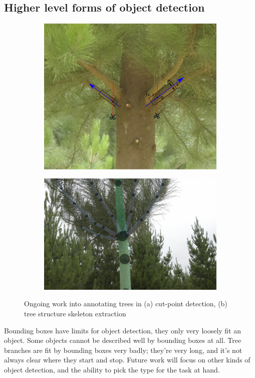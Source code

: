 \subsection{Higher level forms of object detection}

\begin{figure}[h!]
\begin{subfigure}[t]{1.0\linewidth}
  \centering
  \includegraphics[width=0.8\linewidth]{figures/future/tree_cutpoint.pdf}
  \caption{} 
\end{subfigure}

\begin{subfigure}[t]{1.0\linewidth}
  \centering
  \includegraphics[width=0.8\linewidth]{figures/future/tree_branches.jpg}
  \caption{} 
\end{subfigure}
\caption{Ongoing work into annotating trees in (a) cut-point detection, (b) tree structure skeleton extraction }
\label {fig:future_trees}
\end{figure}

Bounding boxes have limits for object detection, they only very loosely fit an object. Some objects cannot be described well by bounding boxes at all. Tree branches are fit by bounding boxes very badly; they're very long, and it's not always clear where they start and stop. Future work will focus on other kinds of object detection, and the ability to pick the type for the task at hand.

